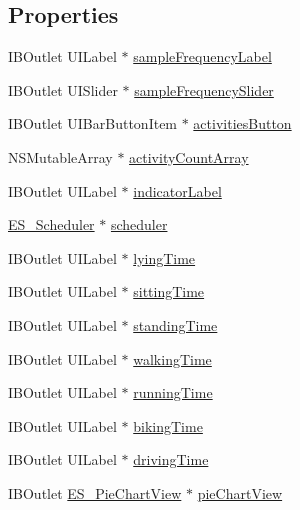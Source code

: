 \subsection*{Properties}
\begin{DoxyCompactItemize}
\item 
I\+B\+Outlet U\+I\+Label $\ast$ \hyperlink{category_e_s___home_view_controller_07_08_ad871939fccf98c6f07790fb7f5ac5e3f}{sample\+Frequency\+Label}
\item 
I\+B\+Outlet U\+I\+Slider $\ast$ \hyperlink{category_e_s___home_view_controller_07_08_a2ffe7f98daf31e23f420e82e291a0c10}{sample\+Frequency\+Slider}
\item 
I\+B\+Outlet U\+I\+Bar\+Button\+Item $\ast$ \hyperlink{category_e_s___home_view_controller_07_08_ac407a8994dd37ae0611db193c4b1fce5}{activities\+Button}
\item 
N\+S\+Mutable\+Array $\ast$ \hyperlink{category_e_s___home_view_controller_07_08_a1b9d99f9eebec974edea9c90aa8bcbd5}{activity\+Count\+Array}
\item 
I\+B\+Outlet U\+I\+Label $\ast$ \hyperlink{category_e_s___home_view_controller_07_08_acf6fcace1d5e7b52cecd8d297169806b}{indicator\+Label}
\item 
\hyperlink{interface_e_s___scheduler}{E\+S\+\_\+\+Scheduler} $\ast$ \hyperlink{category_e_s___home_view_controller_07_08_a082e23195d111389dc6efe3129fbe7b3}{scheduler}
\item 
I\+B\+Outlet U\+I\+Label $\ast$ \hyperlink{category_e_s___home_view_controller_07_08_af055de6fe1c67f984f38e374cc658354}{lying\+Time}
\item 
I\+B\+Outlet U\+I\+Label $\ast$ \hyperlink{category_e_s___home_view_controller_07_08_a5695f27d8024f4b27513621078ec69fa}{sitting\+Time}
\item 
I\+B\+Outlet U\+I\+Label $\ast$ \hyperlink{category_e_s___home_view_controller_07_08_aba325c3901e70330603439c533b6a9b2}{standing\+Time}
\item 
I\+B\+Outlet U\+I\+Label $\ast$ \hyperlink{category_e_s___home_view_controller_07_08_ad902a079ef4cad508e5f2fbed07de64e}{walking\+Time}
\item 
I\+B\+Outlet U\+I\+Label $\ast$ \hyperlink{category_e_s___home_view_controller_07_08_a2f4da7defb6051371a656077898e7767}{running\+Time}
\item 
I\+B\+Outlet U\+I\+Label $\ast$ \hyperlink{category_e_s___home_view_controller_07_08_a6f2753e5d6f2cffa90b89a11846f5465}{biking\+Time}
\item 
I\+B\+Outlet U\+I\+Label $\ast$ \hyperlink{category_e_s___home_view_controller_07_08_a8f29ecd555c5af49432c3afed2870e72}{driving\+Time}
\item 
I\+B\+Outlet \hyperlink{interface_e_s___pie_chart_view}{E\+S\+\_\+\+Pie\+Chart\+View} $\ast$ \hyperlink{category_e_s___home_view_controller_07_08_a5fa6685e799c5d5d9e6ad9f7f97fd4ab}{pie\+Chart\+View}
\end{DoxyCompactItemize}



